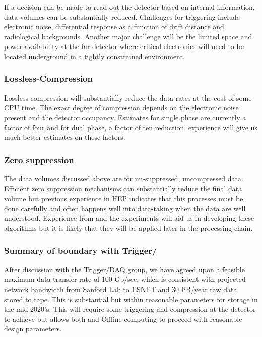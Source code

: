 If a decision can be made to read  out the detector based on internal information, data volumes can be substantially reduced.  
Challenges for triggering include electronic noise, differential response as a function of drift distance and radiological backgrounds.
Another major challenge will be the limited space and power availability at the far detector where critical electronics will need to be located underground in a tightly constrained environment. 

\subsubsection{Lossless-Compression}

Lossless compression will substantially reduce the data rates at the cost of some CPU time.  The exact degree of compression  depends on the electronic noise present and the detector occupancy.  Estimates for single phase are currently a factor of four and for dual phase, a factor of ten reduction.   experience will give us much better estimates on these factors.


\subsubsection{Zero suppression}

The data volumes discussed above are for un-suppressed, uncompressed data.  Efficient zero suppression mechanisms can substantially reduce the final data volume but previous experience in HEP indicates that this processes must be done carefully and often happens well into data-taking when the data are well understood.  Experience from   and the  experiments will aid us in developing these algorithms but it is likely that they will be applied later in the processing chain.  

\subsubsection{Summary of boundary with Trigger/}

After discussion with the Trigger/DAQ group, we have agreed upon a feasible maximum data transfer rate of 100 Gb/sec, which is consistent with projected network bandwidth from Sanford Lab to ESNET and 30 PB/year raw data stored to tape.  This is substantial but within reasonable parameters for storage in the mid-2020's.  This will require some triggering and compression at the detector to achieve but allows both  and Offline computing to proceed with reasonable design parameters.

